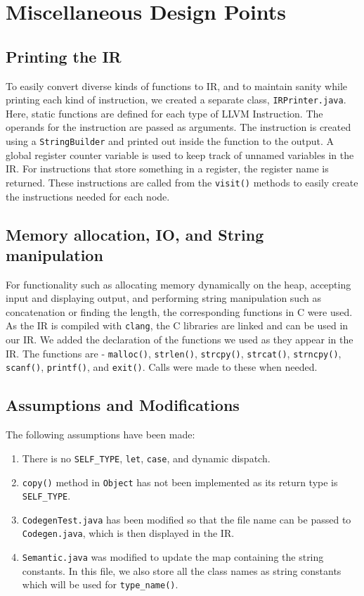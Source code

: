 \documentclass{article}
\begin{document}
\section{Miscellaneous Design Points}

\subsection{Printing the IR}
To easily convert diverse kinds of functions to IR, and to maintain sanity while printing each kind of instruction, we created a separate class, \verb|IRPrinter.java|. Here, static functions are defined for each type of LLVM Instruction. The operands for the instruction are passed as arguments. The instruction is created using a \verb|StringBuilder| and printed out inside the function to the output. A global register counter variable is used to keep track of unnamed variables in the IR. For instructions that store something in a register, the register name is returned. These instructions are called from the \verb|visit()| methods to easily create the instructions needed for each node.

\subsection{Memory allocation, IO, and String manipulation}
For functionality such as allocating memory dynamically on the heap, accepting input and displaying output, and performing string manipulation such as concatenation or finding the length, the corresponding functions in C were used. As the IR is compiled with \verb|clang|, the C libraries are linked and can be used in our IR. We added the declaration of the functions we used as they appear in the IR. The functions are - \verb|malloc()|, \verb|strlen()|, \verb|strcpy()|, \verb|strcat()|, \verb|strncpy()|, \verb|scanf()|, \verb|printf()|, and \verb|exit()|. Calls were made to these when needed.

\subsection{Assumptions and Modifications}
The following assumptions have been made:
\begin{enumerate}
	\item There is no \verb|SELF_TYPE|, \verb|let|, \verb|case|, and dynamic dispatch.
	\item \verb|copy()| method in \verb|Object| has not been implemented as its return type is \verb|SELF_TYPE|.
	\item \verb|CodegenTest.java| has been modified so that the file name can be passed to \verb|Codegen.java|, which is then displayed in the IR.
	\item \verb|Semantic.java| was modified to update the map containing the string constants. In this file, we also store all the class names as string constants which will be used for \verb|type_name()|.
\end{enumerate}
\end{document}
